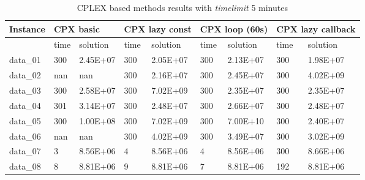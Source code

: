 \begin{table}[!h]
\caption{\textsc{CPLEX} based methods results with \textit{timelimit} 5 minutes}
\begin{tabular}{lllllllll}
\hline
Instance & \multicolumn{2}{l}{\textbf{CPX basic}} & \multicolumn{2}{l}{\textbf{CPX lazy const}} & \multicolumn{2}{l}{\textbf{CPX loop (60s)}} & \multicolumn{2}{l}{\textbf{CPX lazy callback}} \\ \hline
         & time                & solution                & time                  & solution                 & time               & solution               & time                 & solution                \\ \hline
data\_01 & 300                 & 2.45E+07                & 300                   & 2.05E+07                 & 300                & 2.13E+07               & 300                  & 1.98E+07                \\
data\_02 & nan                 & nan                     & 300                   & 2.16E+07                 & 300                & 2.45E+07               & 300                  & 4.02E+09                \\
data\_03 & 300                 & 2.58E+07                & 300                   & 7.02E+09                 & 300                & 2.35E+07               & 300                  & 2.35E+07                \\
data\_04 & 301                 & 3.14E+07                & 300                   & 2.48E+07                 & 300                & 2.66E+07               & 300                  & 2.48E+07                \\
data\_05 & 300                 & 1.00E+08                & 300                   & 7.02E+09                 & 300                & 7.00E+10               & 300                  & 2.40E+07                \\
data\_06 & nan                 & nan                     & 300                   & 4.02E+09                 & 300                & 3.49E+07               & 300                  & 3.02E+09                \\
data\_07 & 3                   & 8.56E+06                & 4                     & 8.56E+06                 & 4                  & 8.56E+06               & 300                  & 8.66E+06                \\
data\_08 & 8                   & 8.81E+06                & 9                     & 8.81E+06                 & 7                  & 8.81E+06               & 192                  & 8.81E+06                \\

\end{tabular}
\end{table}
